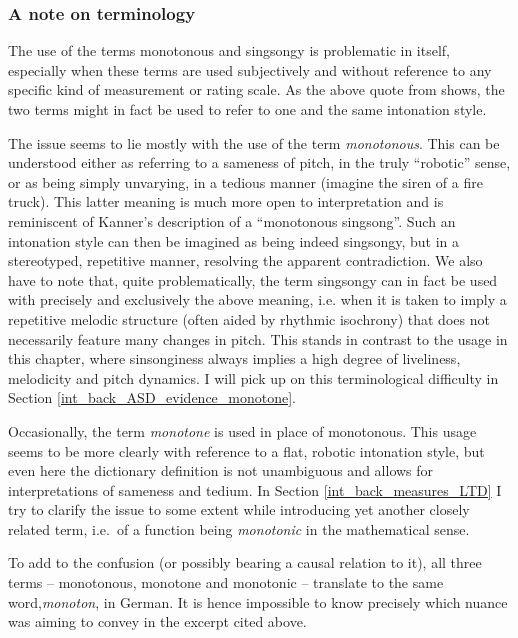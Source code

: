 	\subsubsection{A note on terminology}\label{int_back_ASD_terminology}

The use of the terms monotonous and singsongy is problematic in itself, especially when these terms are used subjectively and without reference to any specific kind of measurement or rating scale. As the above quote from \citet{kannerAutisticDisturbancesAffective1943} shows, the two terms might in fact be used to refer to one and the same intonation style.

The issue seems to lie mostly with the use of the term \emph{monotonous}. This can be understood either as referring to a sameness of pitch, in the truly ``robotic'' sense, or as being simply unvarying, in a tedious manner (imagine the siren of a fire truck). This latter meaning is much more open to interpretation and is reminiscent of Kanner's description of a ``monotonous singsong''. Such an intonation style can then be imagined as being indeed singsongy, but in a stereotyped, repetitive manner, resolving the apparent contradiction. We also have to note that, quite problematically, the term singsongy can in fact be used with precisely and exclusively the above meaning, i.e. when it is taken to imply a repetitive melodic structure (often aided by rhythmic isochrony) that does not necessarily feature many changes in pitch. This stands in contrast to the usage in this chapter, where sinsonginess always implies a high degree of liveliness, melodicity and pitch dynamics. I will pick up on this terminological difficulty in Section \ref{int_back_ASD_evidence_monotone}.

Occasionally, the term \emph{monotone} is used in place of monotonous. This usage seems to be more clearly with reference to a flat, robotic intonation style, but even here the dictionary definition is not unambiguous and allows for interpretations of sameness and tedium. In Section \ref{int_back_measures_LTD} I try to clarify the issue to some extent while introducing yet another closely related term, i.e.~of a function being \emph{monotonic} in the mathematical sense.

To add to the confusion (or possibly bearing a causal relation to it), all three terms -- monotonous, monotone and monotonic -- translate to the same word,\emph{mo\-no\-ton}, in German. It is hence impossible to know precisely which nuance \citet{aspergerAutistischenPsychopathenIm1944a} was aiming to convey in the excerpt cited above.

